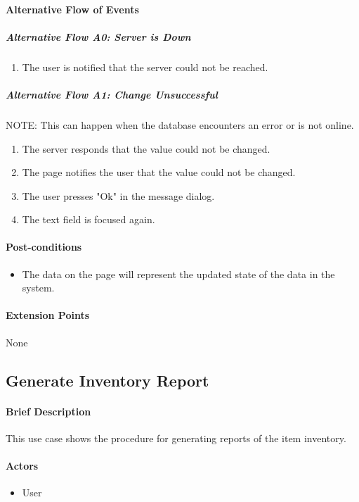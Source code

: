 \documentclass{article}
\begin{document}
\paragraph{Alternative Flow of Events}

\subparagraph{Alternative Flow A0: Server is Down}
\begin{enumerate}
\item The user is notified that the server could not be reached.
\end{enumerate}

\subparagraph{Alternative Flow A1: Change Unsuccessful}
NOTE: This can happen when the database encounters an error or is not online.
\begin{enumerate}
\item The server responds that the value could not be changed.
\item The page notifies the user that the value could not be changed.
\item The user presses "Ok" in the message dialog.
\item The text field is focused again.
\end{enumerate}

\paragraph{Post-conditions}
\begin{itemize}
\item The data on the page will represent the updated state of the data in the system.
\end{itemize}

\paragraph{Extension Points}
None

\subsection{Generate Inventory Report}

\paragraph{Brief Description}
This use case shows the procedure for generating reports of the item inventory.

\paragraph{Actors}
\begin{itemize}
\item User
\end{itemize}
\end{document}
